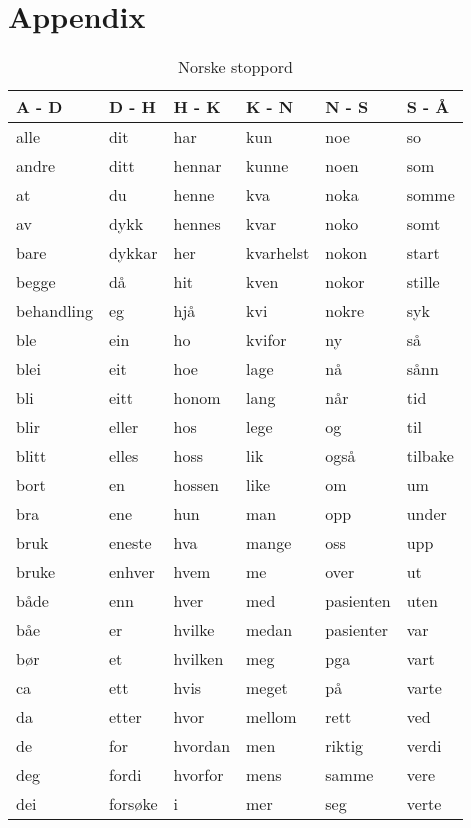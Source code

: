 \section{Appendix}
\label{sec:appendix}

\begin{table}[htbp] \footnotesize \center
\caption{Norske stoppord\label{tab:stopwords}}
\begin{tabular}{l l l l l l}
    \toprule
    A - D & D - H & H - K & K - N & N - S & S - Å \\
    \midrule
    alle & dit & har & kun & noe & so \\
    andre & ditt & hennar & kunne & noen & som \\
    at & du & henne & kva & noka & somme \\
    av & dykk & hennes & kvar & noko & somt \\
    bare & dykkar & her & kvarhelst & nokon & start \\
    begge & då & hit & kven & nokor & stille \\
    behandling & eg & hjå & kvi & nokre & syk \\
    ble & ein & ho & kvifor & ny & så \\
    blei & eit & hoe & lage & nå & sånn \\
    bli & eitt & honom & lang & når & tid \\
    blir & eller & hos & lege & og & til \\
    blitt & elles & hoss & lik & også & tilbake \\
    bort & en & hossen & like & om & um \\
    bra & ene & hun & man & opp & under \\
    bruk & eneste & hva & mange & oss & upp \\
    bruke & enhver & hvem & me & over & ut \\
    både & enn & hver & med & pasienten & uten \\
    båe & er & hvilke & medan & pasienter & var \\
    bør & et & hvilken & meg & pga & vart \\
    ca & ett & hvis & meget & på & varte \\
    da & etter & hvor & mellom & rett & ved \\
    de & for & hvordan & men & riktig & verdi \\
    deg & fordi & hvorfor & mens & samme & vere \\
    dei & forsøke & i & mer & seg & verte \\

\end{tabular}
\end{table}
